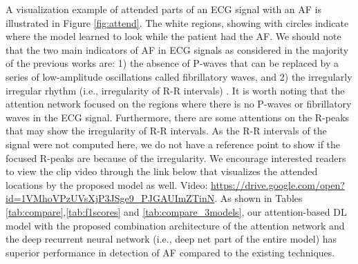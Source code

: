 \documentclass[conference]{IEEEtran}
\begin{document}
A visualization example of attended parts of an ECG signal with an AF is illustrated in Figure \ref{fig:attend}. The white regions, showing with circles indicate where the model learned to look while the patient had the  AF. We should note that the two main indicators of AF in ECG signals as considered in the majority of the previous works are: 1) the absence of P-waves that can be replaced by a series of low-amplitude oscillations called fibrillatory waves, and 2) the irregularly irregular rhythm (i.e., irregularity of R-R intervals) \cite{jiang2012high,babaeizadeh2009improvements,huang2011novel}. It is worth noting that the attention network focused on the regions where there is no P-waves or fibrillatory waves in the ECG signal. Furthermore, there are some attentions on the R-peaks that may show the irregularity of R-R intervals. As the R-R intervals of the signal were not computed here, we do not have a reference point to show if the focused R-peaks are because of the irregularity. We encourage interested readers to view the clip video through the link below that visualizes the attended locations by the proposed model as well.
Video: \url{https://drive.google.com/open?id=1VMhoVPzUVsXjP3JSge9_PJGAUImZTinN}. As shown in Tables \ref{tab:compare},\ref{tab:f1scores} and \ref{tab:compare_3models}, our attention-based DL model with the proposed combination architecture of the attention network and the deep recurrent neural network (i.e., deep net part of the entire model) has superior performance in detection of AF compared to the existing techniques. 


\begin{table*} [htb] 
\caption{$F_1$ scores of each classification type obtained by the proposed method on different PhysioNet databases.}
\end{table*}
\end{document}
